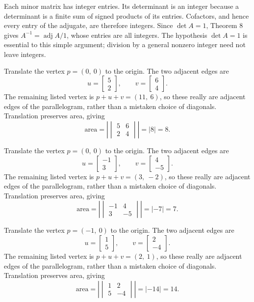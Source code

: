Each minor matrix has integer entries. Its determinant is an integer because a determinant is a finite sum of signed products of its entries. Cofactors, and hence every entry of the adjugate, are therefore integers. Since $\det A=1$, Theorem 8 gives $A^{-1}=\operatorname{adj}A/1$, whose entries are all integers. The hypothesis $\det A=1$ is essential to this simple argument; division by a general nonzero integer need not leave integers.

Translate the vertex $p=\left( 0, \  0\right)$ to the origin. The two adjacent edges are
\[u=\begin{bmatrix}5\\2\end{bmatrix},\qquad v=\begin{bmatrix}6\\4\end{bmatrix}.\]
The remaining listed vertex is $p+u+v=\left( 11, \  6\right)$, so these really are adjacent edges of the parallelogram, rather than a mistaken choice of diagonals. Translation preserves area, giving
\[\text{area}=\left|\begin{vmatrix}5&6\\2&4\end{vmatrix}\right|=|8|=8.\]


Translate the vertex $p=\left( 0, \  0\right)$ to the origin. The two adjacent edges are
\[u=\begin{bmatrix}-1\\3\end{bmatrix},\qquad v=\begin{bmatrix}4\\-5\end{bmatrix}.\]
The remaining listed vertex is $p+u+v=\left( 3, \  -2\right)$, so these really are adjacent edges of the parallelogram, rather than a mistaken choice of diagonals. Translation preserves area, giving
\[\text{area}=\left|\begin{vmatrix}-1&4\\3&-5\end{vmatrix}\right|=|-7|=7.\]


Translate the vertex $p=\left( -1, \  0\right)$ to the origin. The two adjacent edges are
\[u=\begin{bmatrix}1\\5\end{bmatrix},\qquad v=\begin{bmatrix}2\\-4\end{bmatrix}.\]
The remaining listed vertex is $p+u+v=\left( 2, \  1\right)$, so these really are adjacent edges of the parallelogram, rather than a mistaken choice of diagonals. Translation preserves area, giving
\[\text{area}=\left|\begin{vmatrix}1&2\\5&-4\end{vmatrix}\right|=|-14|=14.\]



